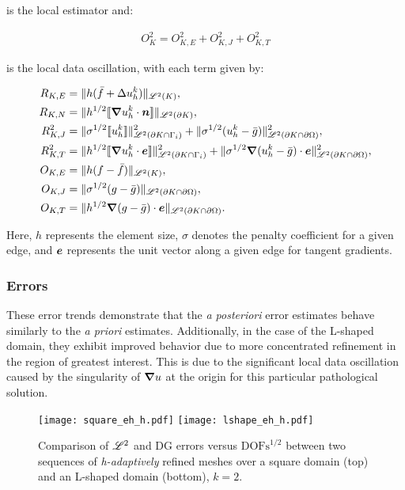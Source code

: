 is the local estimator and:

\begin{gather}
	O_K^2 = O_{K, E}^2 + O_{K, J}^2 + O_{K, T}^2
\end{gather}

is the local data oscillation, with each term given by:

\begin{align}
	R_{K, E} &= \lVert h (\bar{f} + \Delta u^k_h) \rVert_{\mathscr{L}^2(K)}, \\
	R_{K, N} &= \lVert h^{1/2} \llbracket \bm{\nabla} u^k_h \cdot \bm{n} \rrbracket \rVert_{\mathscr{L}^2(\partial K)}, \\
	R^2_{K, J} &= \lVert \sigma^{1/2} \llbracket u^k_h \rrbracket \rVert^2_{\mathscr{L}^2(\partial K \cap \Gamma_{i})} + \lVert \sigma^{1/2} (u^k_h - \bar{g}) \rVert^2_{\mathscr{L}^2(\partial K \cap \partial \Omega)}, \\
	R^2_{K, T} &= \lVert h^{1/2} \llbracket \bm{\nabla} u^k_h \cdot \bm{e} \rrbracket \rVert^2_{\mathscr{L}^2(\partial K \cap \Gamma_{i})} + \lVert \sigma^{1/2} \bm{\nabla} (u^k_h - \bar{g}) \cdot \bm{e} \rVert^2_{\mathscr{L}^2(\partial K \cap \partial \Omega)}, \\
	O_{K, E} &= \lVert h (f - \bar{f}) \rVert_{\mathscr{L}^2(K)}, \\
	O_{K, J} &= \lVert \sigma^{1/2} (g - \bar{g}) \rVert_{\mathscr{L}^2(\partial K \cap \partial \Omega)}, \\
	O_{K, T} &= \lVert h^{1/2} \bm{\nabla} (g - \bar{g}) \cdot \bm{e} \rVert_{\mathscr{L}^2(\partial K \cap \partial \Omega)}.
\end{align}

Here, $h$ represents the element size, $\sigma$ denotes the penalty coefficient for a given edge, and $\bm{e}$ represents the unit vector along a given edge for tangent gradients.

\newpage
\subsubsection{Errors}

These error trends demonstrate that the \textit{a posteriori} error estimates behave similarly to the \textit{a priori} estimates. Additionally, in the case of the L-shaped domain, they exhibit improved behavior due to more concentrated refinement in the region of greatest interest. This is due to the significant local data oscillation caused by the singularity of $\bm{\nabla} u$ at the origin for this particular pathological solution.

\begin{figure}[!ht]
	\centering
	\texttt{[image: square\_eh\_h.pdf]}
    \texttt{[image: lshape\_eh\_h.pdf]}
	\caption{Comparison of $\mathscr{L}^2$ and DG errors versus $\text{DOFs}^{1/2}$ between two sequences of \textit{h-adaptively} refined meshes over a square domain (top) and an L-shaped domain (bottom), $k = 2$.}
\end{figure}

